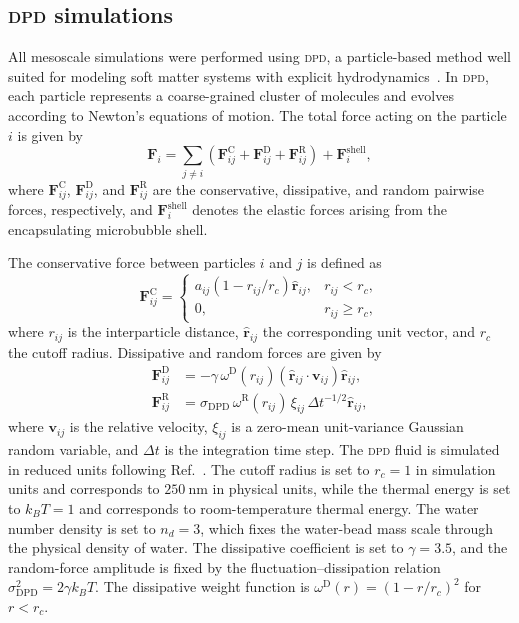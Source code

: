 \documentclass[%
 aip,
 jcp,
 amsmath,amssymb,
 preprint,%
]{revtex4-1}
\begin{document}
\subsection{\textsc{dpd} simulations}
\label{sec:meth:dpd}

\noindent All mesoscale simulations were performed using \textsc{dpd}, a particle-based method well suited for modeling soft matter systems with explicit hydrodynamics~\citep{groot1997dissipative}. In \textsc{dpd}, each particle represents a coarse-grained cluster of molecules and evolves according to Newton's equations of motion. The total force acting on the particle $i$ is given by
\begin{equation}
\label{eq:forces_dpd}
\mathbf{F}_i = \sum_{j \neq i} \left(\mathbf{F}_{ij}^{\mathrm{C}} + \mathbf{F}_{ij}^{\mathrm{D}} + \mathbf{F}_{ij}^{\mathrm{R}} \right) + \mathbf{F}_i^{\mathrm{shell}},
\end{equation}
where $\mathbf{F}_{ij}^{\mathrm{C}}$, $\mathbf{F}_{ij}^{\mathrm{D}}$, and $\mathbf{F}_{ij}^{\mathrm{R}}$ are the conservative, dissipative, and random pairwise forces, respectively, and $\mathbf{F}_i^{\mathrm{shell}}$ denotes the elastic forces arising from the encapsulating microbubble shell.

The conservative force between particles $i$ and $j$ is defined as
\begin{equation}
\mathbf{F}_{ij}^{\mathrm{C}} =
\begin{cases}
a_{ij} \left(1 - r_{ij}/r_c \right) \hat{\mathbf{r}}_{ij}, & r_{ij} < r_c, \\
0, & r_{ij} \geq r_c,
\end{cases}
\end{equation}
where $r_{ij}$ is the interparticle distance, $\hat{\mathbf{r}}_{ij}$ the corresponding unit vector, and $r_c$ the cutoff radius. Dissipative and random forces are given by
\begin{align}
\mathbf{F}_{ij}^{\mathrm{D}} &= -\gamma \, \omega^{\mathrm{D}}(r_{ij}) 
\left(\hat{\mathbf{r}}_{ij} \cdot \mathbf{v}_{ij} \right) \hat{\mathbf{r}}_{ij}, \\
\label{eq:noise_dpd}
\mathbf{F}_{ij}^{\mathrm{R}} &= \sigma_\mathrm{DPD} \, \omega^{\mathrm{R}}(r_{ij}) \, \xi_{ij} \, \Delta t^{-1/2} \hat{\mathbf{r}}_{ij},
\end{align}
where $\mathbf{v}_{ij}$ is the relative velocity, $\xi_{ij}$ is a zero-mean unit-variance Gaussian random variable, and $\Delta t$ is the integration time step. The \textsc{dpd} fluid is simulated in reduced units following Ref.~\cite{ntarakas2025dissipative}. The cutoff radius is set to $r_c=1$ in simulation units and corresponds to $250~\mathrm{nm}$ in physical units, while the thermal energy is set to $k_B T=1$ and corresponds to room-temperature thermal energy. The water number density is set to $n_d=3$, which fixes the water-bead mass scale through the physical density of water. The dissipative coefficient is set to $\gamma=3.5$, and the random-force amplitude is fixed by the fluctuation--dissipation relation $ \sigma_\mathrm{DPD}^2=2\gamma k_B T$. The dissipative weight function is $\omega^{\mathrm{D}}(r)=(1-r/r_c)^2$ for $r<r_c$.
\end{document}
